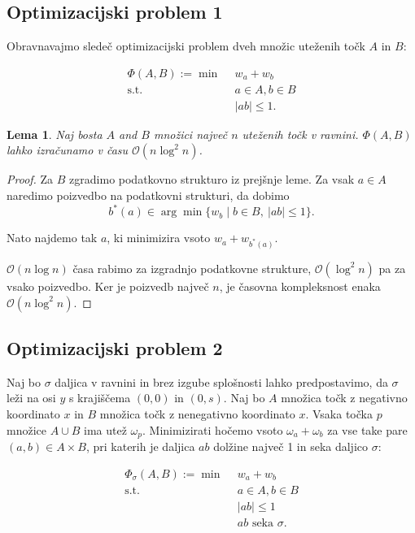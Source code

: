 \documentclass[a4paper, 12pt]{book}
\newcommand{\OO}{\ensuremath{\mathcal{O}}} %
\newtheorem{lema}[izrek]{Lema}
\begin{document}
\subsection{Optimizacijski problem 1}
Obravnavajmo sledeč optimizacijski problem dveh množic uteženih točk $A$ in $B$:

\begin{align*}
	\Phi(A,B) :=\min ~~		& w_a+w_b\\
	 \mbox{s.t.}~~ & a \in A, b\in B\\
				&	|ab|\le 1. 
\end{align*}

\begin{lema}
\label{le:within}
	Naj bosta $A$ and $B$ množici največ $n$ uteženih točk v ravnini.
	$\Phi(A,B)$ lahko izračunamo v času $\OO(n\log^2 n)$.
\end{lema}
\begin{proof}
Za $B$ zgradimo podatkovno strukturo iz prejšnje leme. Za vsak $a\in A$  naredimo poizvedbo na podatkovni strukturi, da dobimo
\[	
		b^*(a) \in \arg\min \{ w_b \mid b\in B,~|ab|\le 1\}.
	\]
	
Nato najdemo tak $a$, ki minimizira vsoto $w_a+w_{b^*(a)}$.

$\OO(n\log n)$ časa rabimo za izgradnjo podatkovne strukture, $\OO(\log^2 n)$ pa za vsako poizvedbo. Ker je poizvedb največ $n$, je časovna kompleksnost enaka $\OO(n\log^2 n)$.
\end{proof}



\subsection{Optimizacijski problem 2}
\label{opt2}

Naj bo $\sigma$ daljica v ravnini in brez izgube splošnosti lahko predpostavimo, da $\sigma$ leži na osi $y$ s krajiščema $(0,0)$ in $(0,s)$. Naj bo $A$ množica točk z negativno koordinato $x$ in $B$ množica točk z nenegativno koordinato $x$. Vsaka točka $p$ množice $A \cup B$ ima utež $\omega_p$. Minimizirati hočemo vsoto $\omega_a + \omega_b$ za vse take pare $(a,b) \in A \times B$, pri katerih je daljica $ab$ dolžine največ 1 in seka daljico $\sigma$:

\begin{align*}
	\Phi_\sigma(A,B) :=\min ~~		& w_a+w_b\\
	 \mbox{s.t.}~~ & a\in A, b\in B\\
				&	|ab|\le 1\\
				&	\mbox{$ab$ seka $\sigma$}. 
\end{align*}
\end{document}
